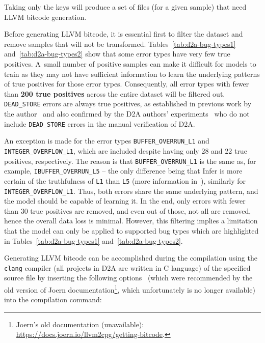 Taking only the keys will produce a set of files (for a given sample) that need LLVM bitcode generation.

Before generating LLVM bitcode, it is essential first to filter the dataset and remove samples that will not be transformed. Tables~\ref{tab:d2a-bug-types1} and~\ref{tab:d2a-bug-types2} show that some error types have very few true positives. A~small number of positive samples can make it difficult for models to train as they may not have sufficient information to learn the underlying patterns of true positives for those error types. Consequently, all error types with fewer than \textbf{200 true positives} across the entire dataset will be filtered out. \texttt{DEAD\_STORE} errors are always true positives, as established in previous work by the author~\cite{bc} and also confirmed by the D2A authors' experiments~\cite{D2A-zheng2021d2a} who do not include \texttt{DEAD\_STORE} errors in the manual verification of D2A.

An exception is made for the error types \texttt{BUFFER\_OVERRUN\_L1} and \texttt{INTEGER\_OVERFLOW\_L1}, which are included despite having only 28 and 22 true positives, respectively. The reason is that \texttt{BUFFER\_OVERRUN\_L1} is the same as, for example, \texttt{IBUFFER\_OVERRUN\_L5} -- the only difference being that Infer is more certain of the truthfulness of \texttt{L1} than \texttt{L5} (more information in~\cite{bc}), similarly for \texttt{INTEGER\_OVERFLOW\_L1}. Thus, both errors share the same underlying pattern, and the model should be capable of learning it. In the end, only errors with fewer than 30 true positives are removed, and even out of those, not all are removed, hence the overall data loss is minimal. However, this filtering implies a limitation that the model can only be applied to supported bug types which are highlighted in Tables~\ref{tab:d2a-bug-types1} and~\ref{tab:d2a-bug-types2}.

Generating LLVM bitcode can be accomplished during the compilation using the \texttt{clang} compiler (all projects in D2A are written in C language) of the specified source file by inserting the following options~\cite{clang-doc} (which were recommended by the old version of Joern documentation\footnote{Joern's old documentation (unavailable): \url{https://docs.joern.io/llvm2cpg/getting-bitcode}.}, which unfortunately is no longer available) into the compilation command:

